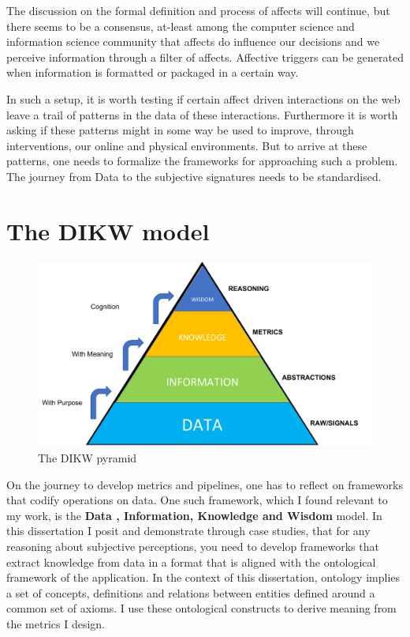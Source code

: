 The discussion on the formal definition and process of affects will continue, but there seems to be a consensus, at-least among the computer science and information science community that affects do influence our decisions and we perceive information through a filter of affects. Affective triggers can be generated when information is formatted or packaged in a certain way. 

In such a setup, it is worth testing if certain affect driven interactions on the web leave a trail of patterns in the data of these interactions. Furthermore it is worth asking if these patterns might in some way be used to improve, through interventions, our online and physical environments. But to arrive at these patterns, one needs to formalize the frameworks for approaching such a problem. 
The journey from Data to the subjective signatures needs to be standardised. 

\section{The DIKW model}

\begin{figure}[t!]
    \centering
    \includegraphics[width=\columnwidth]{DIKW.pdf}
    \caption{The DIKW pyramid}
    \label{fig:dikw}
\end{figure}

On the journey to develop metrics and pipelines, one has to reflect on frameworks that codify operations on data. One such framework, which I found relevant to my work, is the \textbf{Data , Information, Knowledge and Wisdom} model\cite{rowley2007wisdom}. In this dissertation I posit and demonstrate through case studies, that for any reasoning about subjective perceptions, you need to develop frameworks that extract knowledge from data in a format that is aligned with the ontological framework of the application. In the context of this dissertation, ontology implies a set of concepts, definitions and relations between entities defined around a common set of axioms. I use these ontological constructs to derive meaning from the metrics I design. 

